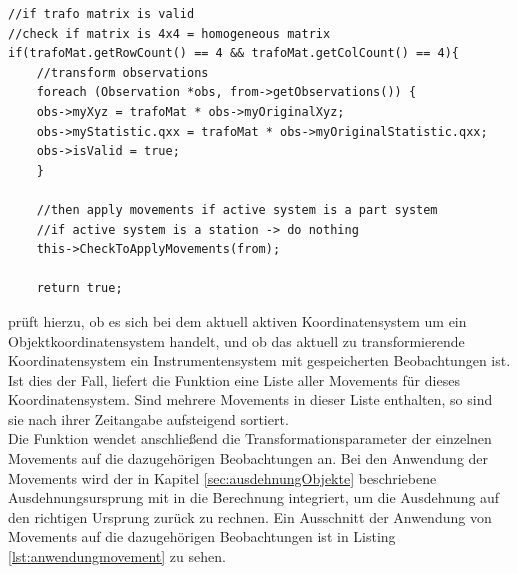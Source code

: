 \begin{lstlisting}[caption={Anwendung von Transformationsparametern},captionpos=t,label=lst:anwendungtrafo]
//if trafo matrix is valid
//check if matrix is 4x4 = homogeneous matrix
if(trafoMat.getRowCount() == 4 && trafoMat.getColCount() == 4){
	//transform observations
	foreach (Observation *obs, from->getObservations()) {
	obs->myXyz = trafoMat * obs->myOriginalXyz;
	obs->myStatistic.qxx = trafoMat * obs->myOriginalStatistic.qxx;
	obs->isValid = true;
	}

	//then apply movements if active system is a part system
	//if active system is a station -> do nothing
	this->CheckToApplyMovements(from);

	return true;
\end{lstlisting}

\mbox{} prüft hierzu, ob es sich bei dem aktuell aktiven Koordinatensystem um ein Objektkoordinatensystem handelt, und ob das aktuell zu transformierende Koordinatensystem ein Instrumentensystem mit gespeicherten Beobachtungen ist.
Ist dies der Fall, liefert die Funktion  eine Liste aller Movements für dieses Koordinatensystem. Sind mehrere Movements in dieser Liste enthalten, so sind sie nach ihrer Zeitangabe aufsteigend sortiert.\\
Die Funktion  wendet anschließend die Transformationsparameter der einzelnen Movements auf die dazugehörigen Beobachtungen an. Bei den Anwendung der Movements wird der in Kapitel \ref{sec:ausdehnungObjekte} beschriebene Ausdehnungsursprung mit in die Berechnung integriert, um die Ausdehnung auf den richtigen Ursprung zurück zu rechnen. Ein Ausschnitt der Anwendung  von Movements auf die dazugehörigen Beobachtungen ist in Listing \ref{lst:anwendungmovement} zu sehen.
